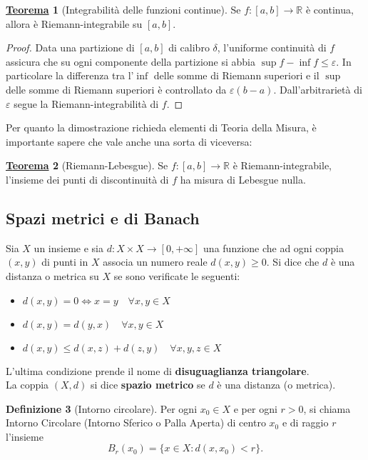 \documentclass[a4paper,twoside]{article}
\renewcommand{\epsilon}{\varepsilon}
\newcommand{\R}{\mathbb{R}}
\theoremstyle{definition}
\newtheorem{theorem}{\color{Red}\underline{\textrm Teorema}}
\newtheorem{definizione}[theorem]{Definizione}
\numberwithin{theorem}{section}
\begin{document}
\begin{theorem}[Integrabilità delle funzioni continue]
Se $f:[a,b]\to\R$ è continua, allora è Riemann-integrabile su $[a,b]$.
\end{theorem}
\begin{proof}
Data una partizione di $[a,b]$ di calibro $\delta$, l'uniforme continuità di $f$ assicura che su ogni componente della partizione si abbia $\sup f-\inf f \leq \epsilon$. In particolare la differenza tra l'$\inf$ delle somme di Riemann superiori e il $\sup$ delle somme di Riemann superiori è controllato da $\epsilon(b-a)$. Dall'arbitrarietà di $\epsilon$ segue la Riemann-integrabilità di $f$. 
\end{proof}

Per quanto la dimostrazione richieda elementi di Teoria della Misura, è importante sapere che vale anche una sorta di viceversa:

\begin{theorem}[Riemann-Lebesgue] Se $f:[a,b]\to\mathbb{R}$ è Riemann-integrabile, l'insieme dei punti di discontinuità di $f$ ha misura di Lebesgue nulla. 
\end{theorem}



\subsection{Spazi metrici e di Banach}
Sia $X$ un insieme e sia $d:X \times X\to [0,+\infty]$ una funzione che ad ogni coppia $(x,y)$ di punti in $X$ associa un numero reale $d(x,y)\geq0$. Si dice che $d$ è una distanza o metrica su $X$ se sono verificate le seguenti:
\begin{itemize}
\item  $d(x,y)=0 \Leftrightarrow x=y\quad\forall x,y\in X$
\item $d(x,y)=d(y,x)\quad\forall x,y\in X$
\item $d(x,y)\leq d(x,z)+d(z,y)\quad\forall x,y,z\in X$
\end{itemize}
L'ultima condizione prende il nome di \textbf{disuguaglianza triangolare}.\\
La coppia $(X,d)$ si dice \textbf{spazio metrico} se $d$ è una distanza (o metrica).

\begin{definizione}[Intorno circolare]
Per ogni $x_0\in X$ e per ogni $r>0$, si chiama Intorno Circolare (Intorno Sferico o Palla Aperta) di centro $x_0$ e di raggio $r$ l'insieme $$B_r(x_0)=\{x\in X: d(x,x_0)<r\}.$$
\end{definizione}
\end{document}
